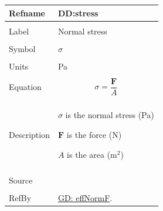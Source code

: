 \documentclass[12pt]{article}
\begin{document}
\noindent \begin{minipage}{\textwidth}
\begin{tabular}{p{} p{}}
\toprule \textbf{Refname} & \textbf{DD:stress}
\label{DD:stress}
\\ \midrule \\
Label & Normal stress
        \\ \midrule \\
        Symbol & $σ$
                 \\ \midrule \\
                 Units & Pa
                         \\ \midrule \\
                         Equation & \begin{displaymath}
                                    σ=\frac{\mathbf{F}}{A}
                                    \end{displaymath}
                                    \\ \midrule \\
                                    Description & \begin{symbDescription}
                                                  \item{$σ$ is the normal stress (Pa)}
                                                  \item{$\mathbf{F}$ is the force (N)}
                                                  \item{$A$ is the area ($\text{m}^{2}$)}
                                                  \end{symbDescription}
                                                  \\ \midrule \\
                                                  Source & \cite{huston2008}
                                                           \\ \midrule \\
                                                           RefBy & \hyperref[GD:effNormF]{GD: effNormF}.
\\ \bottomrule \end{tabular}
\end{minipage}
\par~
\end{document}

